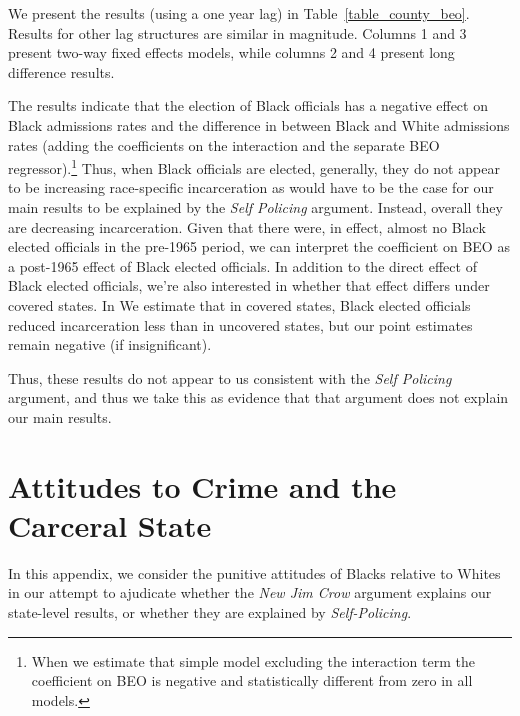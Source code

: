 \documentclass[12pt]{article}
\begin{document}
We present the results (using a one year lag) in Table~\ref{table_county_beo}.  Results for other lag structures are similar in magnitude. Columns 1 and 3 present two-way fixed effects models, while columns 2 and 4 present long difference results.

The results indicate that the election of Black officials has a negative effect on Black admissions rates and the difference in between Black and White admissions rates (adding the coefficients on the interaction and the separate BEO regressor).\footnote{When we estimate that simple model excluding the interaction term the coefficient on BEO is negative and statistically different from zero in all models. }  Thus, when Black officials are elected, generally, they do not appear to be increasing race-specific incarceration as would have to be the case for our main results to be explained by the \emph{Self Policing} argument.  Instead, overall they are decreasing incarceration.  Given that there were, in effect, almost no Black elected officials in the pre-1965 period, we can interpret the coefficient on BEO as a post-1965 effect of Black elected officials. In addition to the direct effect of Black elected officials, we're also interested in whether that effect differs under covered states.  In We estimate that in covered states, Black elected officials reduced incarceration less than in uncovered states, but our point estimates remain negative (if insignificant).

Thus, these results do not appear to us consistent with the \emph{Self Policing} argument, and thus we take this as evidence that that argument does not explain our main results.







\clearpage \newpage
\section{Attitudes to Crime and the Carceral State}\label{appendix_attitudes}
\setcounter{table}{0}
\setcounter{figure}{0}
\renewcommand{\thetable}{I\arabic{table}}
\renewcommand{\thefigure}{I\arabic{figure}}
\normalsize

In this appendix, we consider the punitive attitudes of Blacks relative to Whites in our attempt to ajudicate whether the \emph{New Jim Crow} argument explains our state-level results, or whether they are explained by \emph{Self-Policing}.
\end{document}
